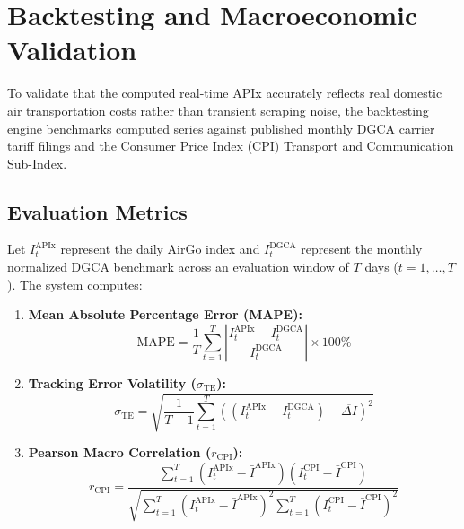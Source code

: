 \documentclass[11pt,a4paper]{article}
\begin{document}
\section{Backtesting and Macroeconomic Validation}
\label{sec:backtest}

To validate that the computed real-time APIx accurately reflects real domestic air transportation costs rather than transient scraping noise, the backtesting engine benchmarks computed series against published monthly DGCA carrier tariff filings and the Consumer Price Index (CPI) Transport and Communication Sub-Index.

\subsection{Evaluation Metrics}
Let $I_t^{\text{APIx}}$ represent the daily AirGo index and $I_t^{\text{DGCA}}$ represent the monthly normalized DGCA benchmark across an evaluation window of $T$ days ($t = 1, \dots, T$). The system computes:
\begin{enumerate}
    \item \textbf{Mean Absolute Percentage Error (MAPE):}
    \begin{equation}
    \text{MAPE} = \frac{1}{T} \sum_{t=1}^T \left| \frac{I_t^{\text{APIx}} - I_t^{\text{DGCA}}}{I_t^{\text{DGCA}}} \right| \times 100\%
    \end{equation}

    \item \textbf{Tracking Error Volatility ($\sigma_{\text{TE}}$):}
    \begin{equation}
    \sigma_{\text{TE}} = \sqrt{\frac{1}{T-1} \sum_{t=1}^T \left( (I_t^{\text{APIx}} - I_t^{\text{DGCA}}) - \overline{\Delta I} \right)^2}
    \end{equation}

    \item \textbf{Pearson Macro Correlation ($r_{\text{CPI}}$):}
    \begin{equation}
    r_{\text{CPI}} = \frac{\sum_{t=1}^T (I_t^{\text{APIx}} - \bar{I}^{\text{APIx}})(I_t^{\text{CPI}} - \bar{I}^{\text{CPI}})}{\sqrt{\sum_{t=1}^T (I_t^{\text{APIx}} - \bar{I}^{\text{APIx}})^2 \sum_{t=1}^T (I_t^{\text{CPI}} - \bar{I}^{\text{CPI}})^2}}
    \end{equation}
\end{enumerate}
\end{document}
